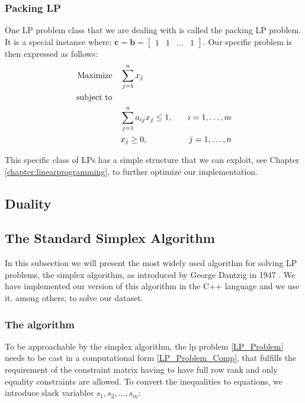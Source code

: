 \subsubsection{Packing LP}
One LP problem class that we are dealing with is called the packing LP problem. It is a special instance where:
\( \mathbf{c}  = \mathbf{b} =  \begin{bmatrix}
    1 & 1 & \dots & 1
\end{bmatrix} \).
Our specific problem is then expressed as follows:
\begin{align}
    \text{Maximize} \quad   & \sum_{j=1}^{n} x_j \notag                                                     \\
    \text{subject to} \quad & \notag                                                                        \\
                            & \sum_{j=1}^{n} a_{ij} x_j \leq 1, \quad & i = 1, \ldots, m \notag             \\
                            & x_j \geq 0, \quad                       & j = 1, \ldots, n \label{PLP_Problem}
\end{align}

This specific class of LPs has a simple structure that we can exploit, see
Chapter \ref*{chapter:linearprogramming},
to further optimize our implementation.
\subsection{Duality}\label{duality}

\subsection{The Standard Simplex Algorithm}
In this subsection we will present the most widely used algorithm for solving
LP problems, the simplex algorithm, as introduced by George Dantzig in 1947 
\parencite{dantzig1990origins}. We have implemented our version  of this algorithm 
in the C++ language and we use it, among others, to solve our dataset.
\subsubsection{The algorithm}

To be approachable by the simplex algorithm, the \gls{lp} problem
 \ref{LP_Problem} needs to be cast in a
computational form \ref{LP_Problem_Comp}, that fulfills the requirement of the constraint matrix having to have
full row rank and only equality  constraints are allowed.
To convert the inequalities to equations, we introduce slack variables \(s_1, s_2, \dots, s_m\):

